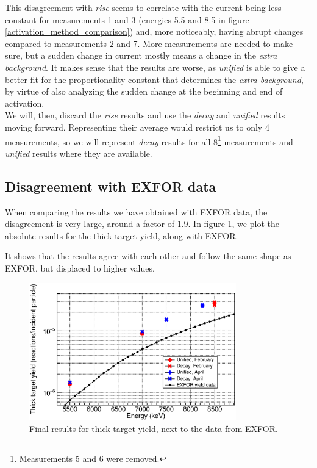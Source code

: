 \documentclass[a4paper,12pt]{report}
\begin{document}
This disagreement with \textit{rise} seems to correlate with the current being less constant for measurements 1 and 3 (energies \num{5.5} and \num{8.5} in figure \ref{activation_method_comparison}) and, more noticeably, having abrupt changes compared to measurements 2 and 7.
More measurements are needed to make sure, but a sudden change in current mostly means a change in the \textit{extra background}.
It makes sense that the results are worse, as \textit{unified} is able to give a better fit for the proportionality constant that determines the \textit{extra background}, by virtue of also analyzing the sudden change at the beginning and end of activation.
\\

We will, then, discard the \textit{rise} results and use the \textit{decay} and \textit{unified} results moving forward.
Representing their average would restrict us to only 4 measurements, so we will represent \textit{decay} results for all 8\footnote{Measurements 5 and 6 were removed.} measurements and \textit{unified} results where they are available.

\subsection{Disagreement with EXFOR data}
When comparing the results we have obtained with EXFOR data, the disagreement is very large, around a factor of \num{1.9}.
In figure \ref{activation_final_results}, we plot the absolute results for the thick target yield, along with EXFOR.

It shows that the results agree with each other and follow the same shape as EXFOR, but displaced to higher values.

\begin{figure}[H]
	\centering
	\includegraphics[width=0.80\textwidth]{activation_final_results.eps}
	\caption{Final results for thick target yield, next to the data from EXFOR.}
	\label{activation_final_results}
\end{figure}
\end{document}
